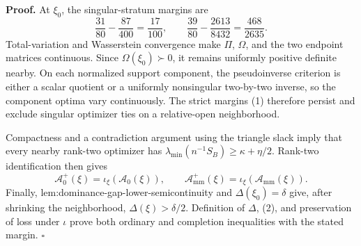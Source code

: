 \textbf{Proof.}
At \(\xi_0\), the singular-stratum margins are
\[
\frac{31}{80}-\frac{87}{400}=\frac{17}{100},
\qquad
\frac{39}{80}-\frac{2613}{8432}=\frac{468}{2635}.
\tag{1}
\]
Total-variation and Wasserstein convergence make \(\Pi\), \(\Omega\), and the two endpoint matrices continuous.  Since \(\Omega(\xi_0)\succ0\), it remains uniformly positive definite nearby.  On each normalized support component, the pseudoinverse criterion is either a scalar quotient or a uniformly nonsingular two-by-two inverse, so the component optima vary continuously.  The strict margins (1) therefore persist and exclude singular optimizer ties on a relative-open neighborhood.

Compactness and a contradiction argument using the triangle slack imply that every nearby rank-two optimizer has \(\lambda_{\min}(n^{-1}S_B)\ge\kappa+\eta/2\).  Rank-two identification then gives
\[
\mathcal A_0^+(\xi)=\iota_\xi(\mathcal A_0(\xi)),
\qquad
\mathcal A_{\mathrm{mm}}^+(\xi)=\iota_\xi(\mathcal A_{\mathrm{mm}}(\xi)).
\tag{2}
\]
Finally, lem:dominance-gap-lower-semicontinuity and \(\Delta(\xi_0)=\delta\) give, after shrinking the neighborhood, \(\Delta(\xi)>\delta/2\).  Definition of \(\Delta\), (2), and preservation of loss under \(\iota\) prove both ordinary and completion inequalities with the stated margin. \(\square\)